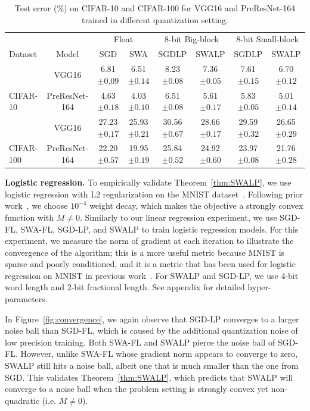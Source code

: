 \documentclass{article}
\begin{document}
\begin{table}[th!]
\centering
\caption{ Test error (\%) on CIFAR-10 and CIFAR-100 for VGG16 and PreResNet-164 trained in different quantization setting.
}
\label{table:base-results}
{\sc\small
\begin{tabular}{@{}lccccccc@{}}
\toprule
& & \multicolumn{2}{c}{Float} & \multicolumn{2}{c}{8-bit Big-block} & \multicolumn{2}{c}{8-bit Small-block } \\ 
\cmidrule(r){3-4}\cmidrule(r){5-6}\cmidrule(r){7-8}
Dataset  & Model & SGD & SWA & SGDLP & SWALP & SGDLP & SWALP \\ \midrule
         & VGG16 & 6.81 $\pm{0.09}$  & 6.51 $\pm{0.14}$ & 8.23 $\pm{0.08}$ & 7.36 $\pm{0.05}$ & 7.61 $\pm{0.15}$ & 
         6.70 $\pm{0.12}$ \\
CIFAR-10 & PreResNet-164  & 4.63 $\pm{0.18}$  & 4.03 $\pm{0.10}$ & 6.51 $\pm{0.08}$ & 5.61 $\pm{0.17}$  & 5.83 $\pm{0.05}$ & 5.01 $\pm{0.14}$ \\
\midrule
          & VGG16          & 27.23 $\pm{0.17}$  & 25.93 $\pm{0.21}$ & 30.56 $\pm{0.67}$ & 28.66 $\pm{0.17}$ & 29.59 $\pm{0.32 }$ &
          26.65 $\pm{0.29}$ \\
CIFAR-100 & PreResNet-164  & 22.20 $\pm{0.57}$  & 19.95 $\pm{0.19}$ & 25.84 $\pm{0.52}$ & 24.92 $\pm{0.60}$ & 23.97 $\pm{0.08}$ & 21.76 $\pm{0.28}$ \\
\bottomrule
\end{tabular}}
\end{table}

\textbf{Logistic regression.} 
To empirically validate Theorem~\ref{thm:SWALP}, we use logistic regression with L2 regularization on the MNIST dataset~\cite{MNIST}.
Following prior work~\cite{HALP, SVRG}, we choose $10^{-4}$ weight decay, which makes the objective a strongly convex function with $M\neq0$.
Similarly to our linear regression experiment, we use SGD-FL, SWA-FL, SGD-LP, and SWALP to train logistic regression models. 
For this experiment, we measure the norm of gradient at each iteration to illustrate the convergence of the algorithm; this is a more useful metric because MNIST is sparse and poorly conditioned, and it is a metric that has been used for logistic regression on MNIST in previous work~\cite{HALP}.
For SWALP and SGD-LP, we use 4-bit word length and 2-bit fractional length.
See appendix for detailed hyper-parameters.

In Figure~\ref{fig:convergence}, we again observe that SGD-LP converges to a larger noise ball than SGD-FL, which is caused by the additional quantization noise of low precision training.
Both SWA-FL and SWALP pierce the noise ball of SGD-FL.
However, unlike SWA-FL whose gradient norm appears to converge to zero, SWALP still hits a noise ball, albeit one that is much smaller than the one from SGD.
This validates Theorem~\ref{thm:SWALP}, which predicts that SWALP will converge to a noise ball when the problem setting is strongly convex yet non-quadratic (i.e. $M \neq 0$).
\end{document}
